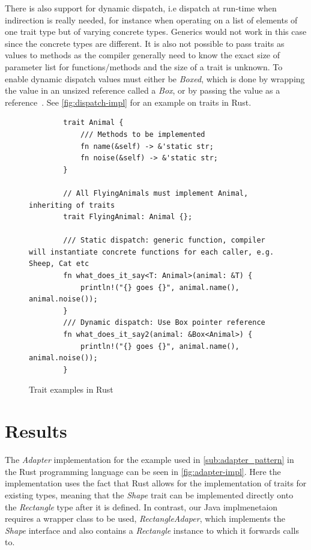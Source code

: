 \documentclass[conference]{IEEEtran}
\begin{document}
There is also support for dynamic dispatch, i.e dispatch at run-time when indirection is really needed, for instance when operating on a list of elements of one trait type but of varying concrete types.
Generics would not work in this case since the concrete types are different.
It is also not possible to pass traits as values to methods as the compiler generally need to know the exact size of parameter list for functions/methods and the size of a trait is unknown.
To enable dynamic dispatch values must either be \emph{Boxed}, which is done by wrapping the value in an unsized reference called a \emph{Box}, or by passing the value as a reference~\cite{rustblog2015:traits}.
See \autoref{fig:dispatch-impl} for an example on traits in Rust.
\begin{figure}[ht]
    \begin{verbatim}
        trait Animal {
            /// Methods to be implemented
            fn name(&self) -> &'static str;
            fn noise(&self) -> &'static str;
        }

        // All FlyingAnimals must implement Animal, inheriting of traits
        trait FlyingAnimal: Animal {};

        /// Static dispatch: generic function, compiler will instantiate concrete functions for each caller, e.g. Sheep, Cat etc
        fn what_does_it_say<T: Animal>(animal: &T) {
            println!("{} goes {}", animal.name(), animal.noise());
        }
        /// Dynamic dispatch: Use Box pointer reference
        fn what_does_it_say2(animal: &Box<Animal>) {
            println!("{} goes {}", animal.name(), animal.noise());
        }

    \end{verbatim}
    \caption{Trait examples in Rust}
    \label{fig:dispatch-impl}
\end{figure}



\section{Results}
The \emph{Adapter} implementation for the example used in \autoref{sub:adapter_pattern} in the Rust programming language can be seen in \autoref{fig:adapter-impl}.
Here the implementation uses the fact that Rust allows for the implementation of traits for existing types, meaning that the \emph{Shape} trait can be implemented directly onto the \emph{Rectangle} type after it is defined.
In contrast, our Java implmenetaion requires a wrapper class to be used, \emph{RectangleAdaper}, which implements the \emph{Shape} interface and also contains a \emph{Rectangle} instance to which it forwards calls to.
\end{document}
